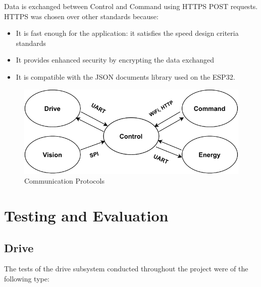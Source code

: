 \documentclass[10pt,twoside]{article}
\begin{document}
Data is exchanged between Control and Command using HTTPS POST requests. HTTPS was chosen over other standards because:
\begin{itemize}[noitemsep]
    \item It is fast enough for the application: it satisfies the speed design criteria standards
    \item It provides enhanced security by encrypting the data exchanged
    \item It is compatible with the JSON documents library used on the ESP32.
\end{itemize}
 

\begin{figure}[hbt!]
    \centering
    \includegraphics[scale=0.7]{Communication_protocols.pdf}
    \captionsetup{justification=centering}
    \caption{Communication Protocols}
\end{figure}

\newpage


\section{Testing and Evaluation}


\subsection{Drive}

The tests of the drive subsystem conducted throughout the project were of the following type:
\end{document}
